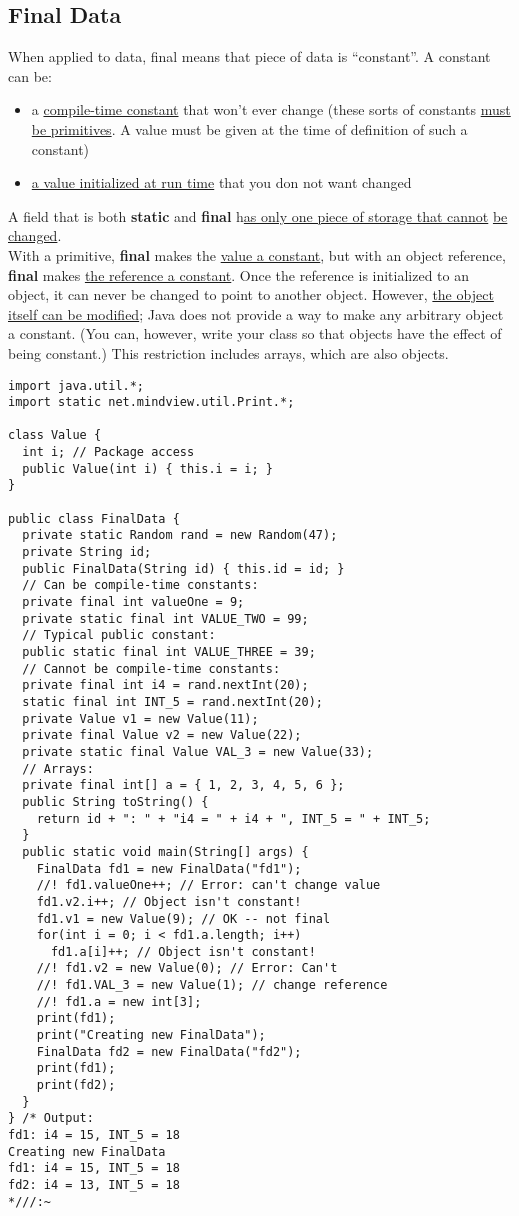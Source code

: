 \documentclass[10pt,letterpaper]{report}
\begin{document}
\subsection{Final Data}
When applied to data, final means that piece of data is ``constant''. A constant can be:
\begin{itemize}
\item a \underline{compile-time constant} that won't ever change (these sorts of constants \underline{must be primitives}. A value must be given at the time of definition of such a constant)
\item \underline{a value initialized at run time} that you don not want changed
\end{itemize}
A field that is both \textbf{static} and \textbf{final} h\underline{as only one piece of storage that cannot} \underline{be changed}.\\

With a primitive, \textbf{final} makes the \underline{value a constant}, but with an object reference, \textbf{final} makes \underline{the reference a constant}. Once the reference is initialized to an object, it can never be changed to point to another object. However, \underline{the object} \underline{itself can be modified}; Java does not provide a way to make any arbitrary object a constant. (You can, however, write your class so that objects have the effect of being constant.) This restriction includes arrays, which are also objects.
\begin{lstlisting}
import java.util.*;
import static net.mindview.util.Print.*;

class Value {
  int i; // Package access
  public Value(int i) { this.i = i; }
}

public class FinalData {
  private static Random rand = new Random(47);
  private String id;
  public FinalData(String id) { this.id = id; }
  // Can be compile-time constants:
  private final int valueOne = 9;
  private static final int VALUE_TWO = 99;
  // Typical public constant:
  public static final int VALUE_THREE = 39;
  // Cannot be compile-time constants:
  private final int i4 = rand.nextInt(20);
  static final int INT_5 = rand.nextInt(20);
  private Value v1 = new Value(11);
  private final Value v2 = new Value(22);
  private static final Value VAL_3 = new Value(33);
  // Arrays:
  private final int[] a = { 1, 2, 3, 4, 5, 6 };
  public String toString() {
    return id + ": " + "i4 = " + i4 + ", INT_5 = " + INT_5;
  }
  public static void main(String[] args) {
    FinalData fd1 = new FinalData("fd1");
    //! fd1.valueOne++; // Error: can't change value
    fd1.v2.i++; // Object isn't constant!
    fd1.v1 = new Value(9); // OK -- not final
    for(int i = 0; i < fd1.a.length; i++)
      fd1.a[i]++; // Object isn't constant!
    //! fd1.v2 = new Value(0); // Error: Can't
    //! fd1.VAL_3 = new Value(1); // change reference
    //! fd1.a = new int[3];
    print(fd1);
    print("Creating new FinalData");
    FinalData fd2 = new FinalData("fd2");
    print(fd1);
    print(fd2);
  }
} /* Output:
fd1: i4 = 15, INT_5 = 18
Creating new FinalData
fd1: i4 = 15, INT_5 = 18
fd2: i4 = 13, INT_5 = 18
*///:~
\end{lstlisting}
\end{document}
